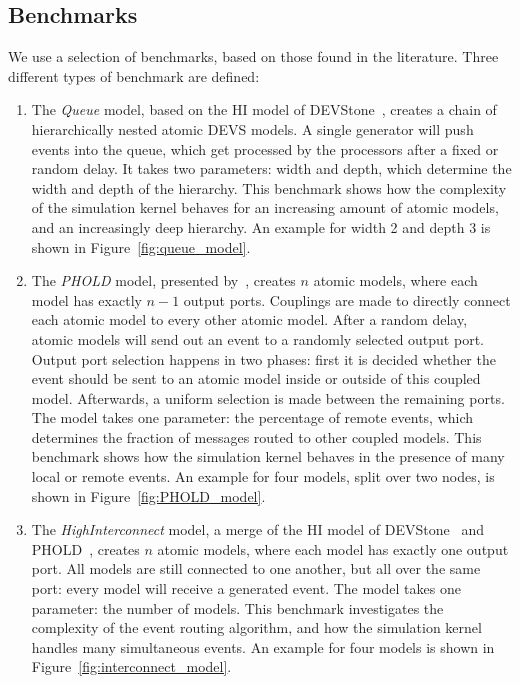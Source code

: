 \subsection{Benchmarks}
We use a selection of benchmarks, based on those found in the literature.
Three different types of benchmark are defined:
\begin{enumerate}
    \item The \textit{Queue} model, based on the HI model of DEVStone~\cite{DEVStone}, creates a chain of hierarchically nested atomic \textsf{DEVS} models.
          A single generator will push events into the queue, which get processed by the processors after a fixed or random delay.
          It takes two parameters: width and depth, which determine the width and depth of the hierarchy.
          This benchmark shows how the complexity of the simulation kernel behaves for an increasing amount of atomic models, and an increasingly deep hierarchy.
          An example for width 2 and depth 3 is shown in Figure~\ref{fig:queue_model}.

    \item The \textit{PHOLD} model, presented by~\cite{PHOLD}, creates $n$ atomic models, where each model has exactly $n-1$ output ports.
          Couplings are made to directly connect each atomic model to every other atomic model.
          After a random delay, atomic models will send out an event to a randomly selected output port.
          Output port selection happens in two phases: first it is decided whether the event should be sent to an atomic model inside or outside of this coupled model.
          Afterwards, a uniform selection is made between the remaining ports.
          The model takes one parameter: the percentage of remote events, which determines the fraction of messages routed to other coupled models.
          This benchmark shows how the simulation kernel behaves in the presence of many local or remote events.
          An example for four models, split over two nodes, is shown in Figure~\ref{fig:PHOLD_model}.

    \item The \textit{HighInterconnect} model, a merge of the HI model of DEVStone~\cite{DEVStone} and PHOLD~\cite{PHOLD}, creates $n$ atomic models, where each model has exactly one output port.
          All models are still connected to one another, but all over the same port: every model will receive a generated event.
          The model takes one parameter: the number of models.
          This benchmark investigates the complexity of the event routing algorithm, and how the simulation kernel handles many simultaneous events.
          An example for four models is shown in Figure~\ref{fig:interconnect_model}.
\end{enumerate}

